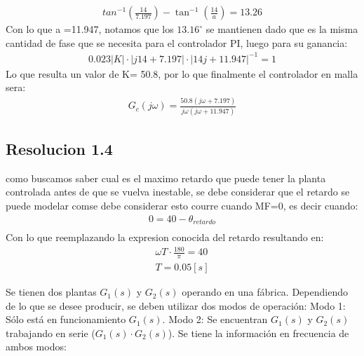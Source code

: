 \documentclass[
  11pt,
  letterpaper,
   addpoints,
   answers
  ]{exam}
\begin{document}
\begin{questions}
\begin{solution}
    \begin{align}
        tan^{-1}\left( \frac{14}{7.197}\right) - \tan^{-1} \left( \frac{14}{a}\right) = 13.26
    \end{align}
    Con lo que a =11.947, notamos que los $13.16^{\circ}$ se mantienen dado que es la misma cantidad de fase que se necesita para el controlador PI, luego para su ganancia:
    \begin{align}
        0.023 |K| \cdot |j14 + 7.197| \cdot |14j + 11.947|^{-1} = 1
    \end{align}
    Lo que resulta un valor de K= 50.8, por lo que finalmente el controlador en malla sera:
    \begin{align}
        G_{c}(j\omega) = \frac{50.8 ( j\omega + 7.197)}{j\omega ( j\omega + 11.947)}
    \end{align}
    \subsection*{Resolucion 1.4}
    como buscamos saber cual es el maximo retardo que puede tener la planta controlada antes de que se vuelva inestable, se debe considerar que el retardo se puede modelar comse debe considerar esto courre cuando MF=0, es decir cuando:
    \begin{align}
        0 = 40 - \theta_{retardo}\\
    \end{align}
    Con lo que reemplazando la expresion conocida del retardo resultando en:
    \begin{align}
        \omega T \cdot \frac{180}{\pi} = 40 \\
        T =0.05[s]
    \end{align}

\end{solution}
    \question Se tienen dos plantas $G_1(s)$ y $G_2(s)$ operando en una fábrica. Dependiendo de lo que se desee producir, se deben utilizar dos modos de operación: Modo 1: Sólo está en funcionamiento $G_1(s)$. Modo 2: Se encuentran $G_1(s)$ y $G_2(s)$ trabajando en serie ($G_1(s) \cdot G_2(s)$). Se tiene la información en frecuencia de ambos modos:


\end{questions}
\end{document}
